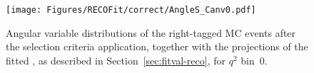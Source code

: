 \begin{figure}[!hbt]
  \centering
  \texttt{[image: Figures/RECOFit/correct/AngleS\_Canv0.pdf]}
  \caption{Angular variable distributions of the right-tagged MC events after the selection criteria application, together with the projections of the fitted \pdf, as described in Section~\ref{sec:fitval-reco}, for $q^2$ bin~0.}
  \label{fig:rtag-bin0}
\end{figure}






